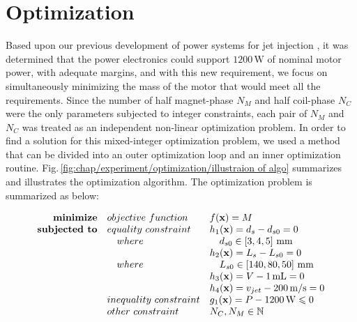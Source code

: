\section{Optimization}                              \label{Chapter:experiment/optimization}


    Based upon our previous development of power systems for jet injection \cite{Ruddy2017}, it was determined that the power electronics could support $1200\,\mathrm{W}$ of nominal motor power, with adequate margins, and with this new requirement, we focus on simultaneously minimizing the mass of the motor that would meet all the requirements. Since the number of half magnet-phase $N_M$ and half coil-phase $N_C$ were the only parameters subjected to integer constraints, each pair of $N_M$ and $N_C$ was treated as an independent non-linear optimization problem. In order to find a solution for this mixed-integer optimization problem, we used a method that can be divided into an outer optimization loop and an inner optimization routine. Fig.\,\ref{fig:chap/experiment/optimization/illustraion of algo} summarizes and illustrates the optimization algorithm. The optimization problem is summarized as below:
    
    
    \begin{equation}
        \begin{array}{rll}
            \textbf{minimize}       & \small{objective\,\,function}     & f(\textbf{x})=M \\
            \textbf{subjected to}   & \small{equality\,\,constraint}    & h_1(\textbf{x})=d_s - d_{s0}= 0\\
                                    &\quad \small{where}                &\quad  d_{s0}\in\left[3,4,5\right]\,\mathrm{mm}\\
                                    &                                   & h_2(\textbf{x})=L_s - L_{s0} = 0\\
                                    &\quad \small{where}                &\quad  L_{s0}\in\left[140,80,50\right]\,\mathrm{mm}\\
                                    &                                   & h_3(\textbf{x})=V - 1\,\mathrm{mL} = 0\\
                                    &                                   & h_4(\textbf{x})=v_{jet} - 200\,\mathrm{m/s}=0\\
                                    & \small{inequality\,\,constraint}  & g_1(\textbf{x})=P - 1200\,\mathrm{W} \leqslant 0\\
                                            & \small{other\,\,constraint}       & N_C, N_M \in 	\mathbb{N} \\ \\
                \end{array}
                \label{eq:outer optimization for PMLSMs 2}
            \end{equation}    


